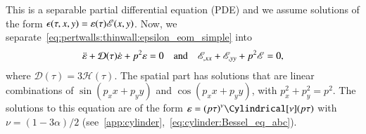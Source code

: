 This is a separable partial differential equation (PDE) and we assume solutions of the form $\epsilon(\tau, x, y) = \varepsilon(\tau)\mathscr{E}(x,y)$. Now, we separate~\cref{eq:pertwalls:thinwall:epsilon_eom_simple} into
\begin{align}\label{eq:pertwalls:thinwall:varepsilon_and_E_eoms}
    \ddot{\varepsilon} + \mathcal{D}(\tau) \dot{\varepsilon} + p^2 \varepsilon = 0 \quad\text{and}\quad  \mathscr{E}_{,xx} + \mathscr{E}_{,yy} + p^2 \mathscr{E} = 0,
\end{align}
where $\mathcal{D}(\tau) = 3\mathcal{H}(\tau)$. %
The spatial part has solutions that are linear combinations of $\sin{(p_x x+p_y y)}$ and $\cos{(p_x x+p_y y)}$, with $p_x^2+p_y^2 = p^2$. %
The solutions to this equation are of the form $\varepsilon = {(p\tau)}^\nu \Cylindrical[\nu](p\tau)$ with $ \nu=(1-3\alpha)/2$ (see~\cref{app:cylinder},~\cref{eq:cylinder:Bessel_eq_abc}).






























